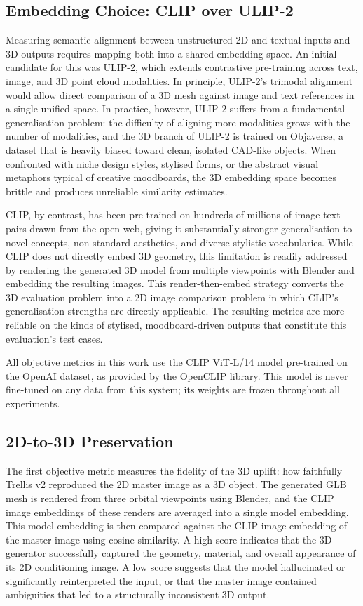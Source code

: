\subsection{Embedding Choice: CLIP over ULIP-2}

Measuring semantic alignment between unstructured 2D and textual inputs and 3D outputs requires mapping both into a shared embedding space. An initial candidate for this was ULIP-2, which extends contrastive pre-training across text, image, and 3D point cloud modalities. In principle, ULIP-2's trimodal alignment would allow direct comparison of a 3D mesh against image and text references in a single unified space. In practice, however, ULIP-2 suffers from a fundamental generalisation problem: the difficulty of aligning more modalities grows with the number of modalities, and the 3D branch of ULIP-2 is trained on Objaverse, a dataset that is heavily biased toward clean, isolated CAD-like objects. When confronted with niche design styles, stylised forms, or the abstract visual metaphors typical of creative moodboards, the 3D embedding space becomes brittle and produces unreliable similarity estimates.

CLIP, by contrast, has been pre-trained on hundreds of millions of image-text pairs drawn from the open web, giving it substantially stronger generalisation to novel concepts, non-standard aesthetics, and diverse stylistic vocabularies. While CLIP does not directly embed 3D geometry, this limitation is readily addressed by rendering the generated 3D model from multiple viewpoints with Blender and embedding the resulting images. This render-then-embed strategy converts the 3D evaluation problem into a 2D image comparison problem in which CLIP's generalisation strengths are directly applicable. The resulting metrics are more reliable on the kinds of stylised, moodboard-driven outputs that constitute this evaluation's test cases.

All objective metrics in this work use the CLIP ViT-L/14 model pre-trained on the OpenAI dataset, as provided by the OpenCLIP library. This model is never fine-tuned on any data from this system; its weights are frozen throughout all experiments.

\subsection{2D-to-3D Preservation}

The first objective metric measures the fidelity of the 3D uplift: how faithfully Trellis v2 reproduced the 2D master image as a 3D object. The generated GLB mesh is rendered from three orbital viewpoints using Blender, and the CLIP image embeddings of these renders are averaged into a single model embedding. This model embedding is then compared against the CLIP image embedding of the master image using cosine similarity. A high score indicates that the 3D generator successfully captured the geometry, material, and overall appearance of its 2D conditioning image. A low score suggests that the model hallucinated or significantly reinterpreted the input, or that the master image contained ambiguities that led to a structurally inconsistent 3D output.

